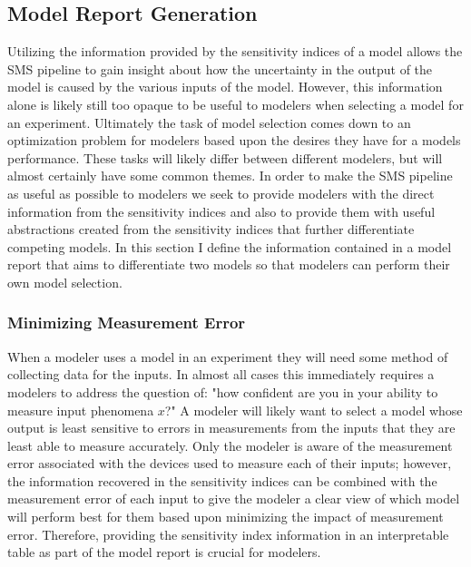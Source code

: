 \subsection{Model Report Generation\label{sec:report_gen}}
Utilizing the information provided by the sensitivity indices of a model allows the SMS pipeline to gain insight about how the uncertainty in the output of the model is caused by the various inputs of the model.
However, this information alone is likely still too opaque to be useful to modelers when selecting a model for an experiment.
Ultimately the task of model selection comes down to an optimization problem for modelers based upon the desires they have for a models performance.
These tasks will likely differ between different modelers, but will almost certainly have some common themes.
In order to make the SMS pipeline as useful as possible to modelers we seek to provide modelers with the direct information from the sensitivity indices and also to provide them with useful abstractions created from the sensitivity indices that further differentiate competing models.
In this section I define the information contained in a model report that aims to differentiate two models so that modelers can perform their own model selection.

\subsubsection{Minimizing Measurement Error\label{sec:min_measure_error}}
When a modeler uses a model in an experiment they will need some method of collecting data for the inputs.
In almost all cases this immediately requires a modelers to address the question of: "how confident are you in your ability to measure input phenomena $x$?"
A modeler will likely want to select a model whose output is least sensitive to errors in measurements from the inputs that they are least able to measure accurately.
Only the modeler is aware of the measurement error associated with the devices used to measure each of their inputs; however, the information recovered in the sensitivity indices can be combined with the measurement error of each input to give the modeler a clear view of which model will perform best for them based upon minimizing the impact of measurement error.
Therefore, providing the sensitivity index information in an interpretable table as part of the model report is crucial for modelers.

